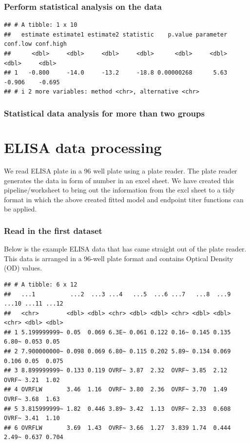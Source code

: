 \documentclass[
]{book}
\begin{document}
\hypertarget{perform-statistical-analysis-on-the-data}{%
\subsubsection{Perform statistical analysis on the data}\label{perform-statistical-analysis-on-the-data}}

\begin{verbatim}
## # A tibble: 1 x 10
##   estimate estimate1 estimate2 statistic    p.value parameter conf.low conf.high
##      <dbl>     <dbl>     <dbl>     <dbl>      <dbl>     <dbl>    <dbl>     <dbl>
## 1   -0.800     -14.0     -13.2     -18.8 0.00000268      5.63   -0.906    -0.695
## # i 2 more variables: method <chr>, alternative <chr>
\end{verbatim}

\hypertarget{statistical-data-analysis-for-more-than-two-groups}{%
\subsubsection{Statistical data analysis for more than two groups}\label{statistical-data-analysis-for-more-than-two-groups}}

\hypertarget{elisa-data-processing}{%
\section{ELISA data processing}\label{elisa-data-processing}}

We read ELISA plate in a 96 well plate using a plate reader. The plate reader generates the data in form of number in an excel sheet. We have created this pipeline/worksheet to bring out the information from the excl sheet to a tidy format in which the above created fitted model and endpoint titer functions can be applied.

\hypertarget{read-in-the-first-dataset}{%
\subsubsection{Read in the first dataset}\label{read-in-the-first-dataset}}

Below is the example ELISA data that has came straight out of the plate reader. This data is arranged in a 96-well plate format and contains Optical Density (OD) values.

\begin{verbatim}
## # A tibble: 6 x 12
##   ...1          ...2  ...3 ...4   ...5  ...6 ...7   ...8  ...9 ...10 ...11 ...12
##   <chr>        <dbl> <dbl> <chr> <dbl> <dbl> <chr> <dbl> <dbl> <chr> <dbl> <dbl>
## 1 5.199999999~ 0.05  0.069 6.3E~ 0.061 0.122 0.16~ 0.145 0.135 6.80~ 0.053 0.05 
## 2 7.900000000~ 0.098 0.069 6.80~ 0.115 0.202 5.89~ 0.134 0.069 0.106 0.05  0.075
## 3 8.899999999~ 0.133 0.119 OVRF~ 3.87  2.32  OVRF~ 3.85  2.12  OVRF~ 3.21  1.02 
## 4 OVRFLW       3.46  1.16  OVRF~ 3.80  2.36  OVRF~ 3.70  1.49  OVRF~ 3.68  1.63 
## 5 3.815999999~ 1.82  0.446 3.89~ 3.42  1.13  OVRF~ 2.33  0.608 OVRF~ 3.41  1.10 
## 6 OVRFLW       3.69  1.43  OVRF~ 3.66  1.27  3.839 1.74  0.444 2.49~ 0.637 0.704
\end{verbatim}
\end{document}
